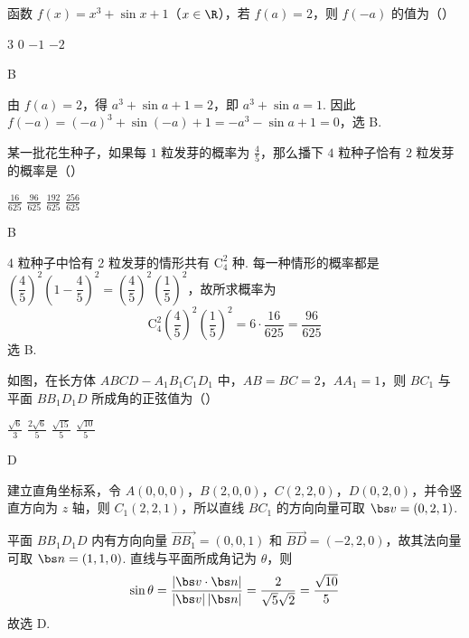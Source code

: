 \begin{problem}
函数 \( f(x) = x^3 + \sin x + 1 \)（\(x \in \R\)），若 \( f(a) = 2 \)，则 \( f(-a) \) 的值为（\quad）

\choices
    {\(3\)}
    {\(0\)}
    {\(-1\)}
    {\(-2\)}
\begin{answer}
B
\end{answer}
\begin{solution}
由 \(f(a)=2\)，得 \(a^3+\sin a+1=2\)，即 \(a^3+\sin a=1\). 因此
\(f(-a)=(-a)^3+\sin(-a)+1=-a^3-\sin a+1=0\)，选 B.
\end{solution}
\end{problem}

\begin{problem}
某一批花生种子，如果每 \(1\) 粒发芽的概率为 \(\frac{4}{5}\)，那么播下 \(4\) 粒种子恰有 \(2\) 粒发芽的概率是（\quad）

\choices
    {\(\frac{16}{625}\)}
    {\(\frac{96}{625}\)}
    {\(\frac{192}{625}\)}
    {\(\frac{256}{625}\)}
\begin{answer}
B
\end{answer}
\begin{solution}
4 粒种子中恰有 2 粒发芽的情形共有 \(\mathrm C_4^2\) 种. 每一种情形的概率都是
\(\left(\dfrac45\right)^2\left(1-\dfrac45\right)^2=\left(\dfrac45\right)^2\left(\dfrac15\right)^2\)，故所求概率为
\[
\mathrm C_4^2\left(\frac45\right)^2\left(\frac15\right)^2=6\cdot\frac{16}{625}=\frac{96}{625}
\]
选 B.
\end{solution}
\end{problem}

\begin{problem}
如图，在长方体 \(ABCD - A_{1}B_{1}C_{1}D_{1}\) 中，\(AB = BC = 2\)，\(AA_{1} = 1\)，则 \(BC_{1}\) 与平面 \(BB_{1}D_{1}D\) 所成角的正弦值为（\quad）


\choices
    {\(\frac{\sqrt{6}}{3}\)}
    {\(\frac{2\sqrt{6}}{5}\)}
    {\(\frac{\sqrt{15}}{5}\)}
    {\(\frac{\sqrt{10}}{5}\)}
\begin{answer}
D
\end{answer}
\begin{solution}
建立直角坐标系，令 \(A(0,0,0)\)，\(B(2,0,0)\)，\(C(2,2,0)\)，\(D(0,2,0)\)，并令竖直方向为 \(z\) 轴，则 \(C_1(2,2,1)\)，所以直线 \(BC_1\) 的方向向量可取 \(\bs v=(0,2,1)\).

平面 \(BB_1D_1D\) 内有方向向量 \(\overrightarrow{BB_1}=(0,0,1)\) 和 \(\overrightarrow{BD}=(-2,2,0)\)，故其法向量可取 \(\bs n=(1,1,0)\). 直线与平面所成角记为 \(\theta\)，则
\[
\sin\theta=\frac{|\bs v\cdot\bs n|}{|\bs v|\,|\bs n|}=\frac{2}{\sqrt5\sqrt2}=\frac{\sqrt{10}}5
\]
故选 D.
\end{solution}
\end{problem}


